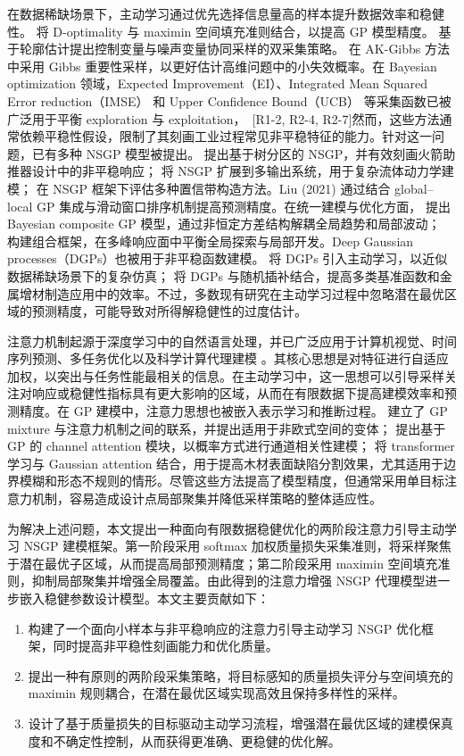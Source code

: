 \documentclass[]{interact}
\DeclareRobustCommand{\reviewadd}[2]{{\color{red}#1}\ {\color{blue}\footnotesize[#2]}}
\theoremstyle{plain}%
\theoremstyle{definition}
\theoremstyle{remark}
\begin{document}
在数据稀缺场景下，主动学习通过优先选择信息量高的样本提升数据效率和稳健性。\citet{Chen2021} 将 D-optimality 与 maximin 空间填充准则结合，以提高 GP 模型精度。\citet{Han2021} 基于轮廓估计提出控制变量与噪声变量协同采样的双采集策略。\citet{Zhang2024} 在 AK-Gibbs 方法中采用 Gibbs 重要性采样，以更好估计高维问题中的小失效概率。\reviewadd{在 Bayesian optimization 领域，Expected Improvement（EI）\citep{Jones1998}、Integrated Mean Squared Error reduction（IMSE）\citep{Sacks1989} 和 Upper Confidence Bound（UCB）\citep{Srinivas2010} 等采集函数已被广泛用于平衡 exploration 与 exploitation，}{R1-2, R2-4, R2-7}然而，这些方法通常依赖平稳性假设，限制了其刻画工业过程常见非平稳特征的能力。针对这一问题，已有多种 NSGP 模型被提出。\citet{Gramacy2008} 提出基于树分区的 NSGP，并有效刻画火箭助推器设计中的非平稳响应；\citet{Konomi2014} 将 NSGP 扩展到多输出系统，用于复杂流体动力学建模；\citet{Rhode2020} 在 NSGP 框架下评估多种置信带构造方法。Liu (2021) 通过结合 global--local GP 集成与滑动窗口排序机制提高预测精度。在统一建模与优化方面，\citet{Davis2021} 提出 Bayesian composite GP 模型，通过非恒定方差结构解耦全局趋势和局部波动；\citet{Meng2022} 构建组合框架，在多峰响应面中平衡全局探索与局部开发。Deep Gaussian processes（DGPs）也被用于非平稳函数建模。\citet{Sauer2022} 将 DGPs 引入主动学习，以近似数据稀缺场景下的复杂仿真；\citet{Gnanasambandam2024} 将 DGPs 与随机插补结合，提高多类基准函数和金属增材制造应用中的效率。不过，多数现有研究在主动学习过程中忽略潜在最优区域的预测精度，可能导致对所得解稳健性的过度估计。

注意力机制起源于深度学习中的自然语言处理，并已广泛应用于计算机视觉、时间序列预测、多任务优化以及科学计算代理建模 \citep{Yu2022}。其核心思想是对特征进行自适应加权，以突出与任务性能最相关的信息。在主动学习中，这一思想可以引导采样关注对响应或稳健性指标具有更大影响的区域，从而在有限数据下提高建模效率和预测精度。在 GP 建模中，注意力思想也被嵌入表示学习和推断过程。\cite{Li2022} 建立了 GP mixture 与注意力机制之间的联系，并提出适用于非欧式空间的变体；\cite{Xie2022} 提出基于 GP 的 channel attention 模块，以概率方式进行通道相关性建模；\cite{Zhong2024} 将 transformer 学习与 Gaussian attention 结合，用于提高木材表面缺陷分割效果，尤其适用于边界模糊和形态不规则的情形。尽管这些方法提高了模型精度，但通常采用单目标注意力机制，容易造成设计点局部聚集并降低采样策略的整体适应性。

为解决上述问题，本文提出一种面向有限数据稳健优化的两阶段注意力引导主动学习 NSGP 建模框架。第一阶段采用 softmax 加权质量损失采集准则，将采样聚焦于潜在最优子区域，从而提高局部预测精度；第二阶段采用 maximin 空间填充准则，抑制局部聚集并增强全局覆盖。由此得到的注意力增强 NSGP 代理模型进一步嵌入稳健参数设计模型。本文主要贡献如下：
\begin{enumerate}
	\item 构建了一个面向小样本与非平稳响应的注意力引导主动学习 NSGP 优化框架，同时提高非平稳性刻画能力和优化质量。
	\item 提出一种有原则的两阶段采集策略，将目标感知的质量损失评分与空间填充的 maximin 规则耦合，在潜在最优区域实现高效且保持多样性的采样。
	\item 设计了基于质量损失的目标驱动主动学习流程，增强潜在最优区域的建模保真度和不确定性控制，从而获得更准确、更稳健的优化解。
\end{enumerate}
\end{document}
